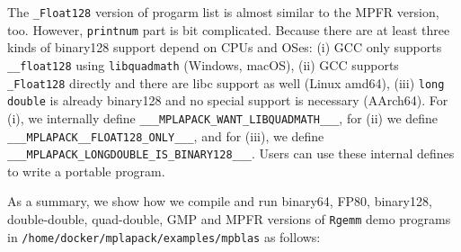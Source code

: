 \documentclass[12pt]{article}
\begin{document}
The {\tt \_Float128} version of progarm list is almost similar to the MPFR version, too. However, {\tt printnum} part is bit complicated. Because there are at least three kinds of binary128 support depend on CPUs and OSes: (i) GCC only supports {\tt \_\_float128} using {\tt libquadmath} (Windows, macOS), (ii) GCC supports {\tt \_Float128} directly and there are libc support as well (Linux amd64), (iii) {\tt long double} is already binary128 and no special support is necessary (AArch64). For (i), we internally define {\tt \_\_\_MPLAPACK\_WANT\_LIBQUADMATH\_\_\_}, for (ii) we define {\tt \_\_\_MPLAPACK\_\_FLOAT128\_ONLY\_\_\_}, and for (iii),
we define {\tt \_\_\_MPLAPACK\_LONGDOUBLE\_IS\_BINARY128\_\_\_}. Users can use these internal defines to write a portable program.

As a summary, we show how we compile and run binary64, FP80, binary128, double-double, quad-double, GMP and MPFR versions of {\tt Rgemm} demo programs in {\tt /home/docker/mplapack/examples/mpblas} as follows:
\end{document}
